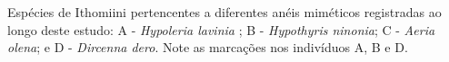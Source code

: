 \label{fig:2.1.1} Espécies de Ithomiini pertencentes a diferentes anéis miméticos registradas ao longo deste estudo: A - \textit{Hypoleria lavinia} ; B - \textit{Hypothyris ninonia}; C - \textit{Aeria olena}; e D - \textit{Dircenna dero}. Note as marcações nos indivíduos A, B e D. 

